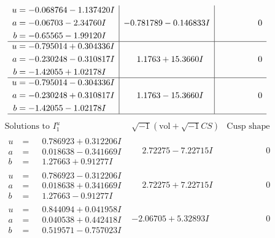 \documentclass[1p]{elsarticle_modified}
\theoremstyle{definition}
\newcommand{\I}{\sqrt{-1}}
\begin{document}
$$\begin{array}{c|c|c}
\begin{aligned}
u &= -0.068764 - 1.137420 I \\
a &= -0.06703 - 2.34760 I \\
b &= -0.65565 - 1.99120 I\end{aligned}
 & -0.781789 - 0.146833 I & \phantom{-0.000000 } 0 \\ \hline\begin{aligned}
u &= -0.795014 + 0.304336 I \\
a &= -0.230248 - 0.310817 I \\
b &= -1.42055 + 1.02178 I\end{aligned}
 & \phantom{-}1.1763 + 15.3660 I & \phantom{-0.000000 } 0 \\ \hline\begin{aligned}
u &= -0.795014 - 0.304336 I \\
a &= -0.230248 + 0.310817 I \\
b &= -1.42055 - 1.02178 I\end{aligned}
 & \phantom{-}1.1763 - 15.3660 I & \phantom{-0.000000 } 0\\
 \hline 
 \end{array}$$\newpage$$\begin{array}{c|c|c}  
\text{Solutions to }I^u_{1}& \I (\text{vol} + \sqrt{-1}CS) & \text{Cusp shape}\\
 \hline 
\begin{aligned}
u &= \phantom{-}0.786923 + 0.312206 I \\
a &= \phantom{-}0.018638 - 0.341669 I \\
b &= \phantom{-}1.27663 + 0.91277 I\end{aligned}
 & \phantom{-}2.72275 - 7.22715 I & \phantom{-0.000000 } 0 \\ \hline\begin{aligned}
u &= \phantom{-}0.786923 - 0.312206 I \\
a &= \phantom{-}0.018638 + 0.341669 I \\
b &= \phantom{-}1.27663 - 0.91277 I\end{aligned}
 & \phantom{-}2.72275 + 7.22715 I & \phantom{-0.000000 } 0 \\ \hline\begin{aligned}
u &= \phantom{-}0.844094 + 0.041958 I \\
a &= \phantom{-}0.040538 + 0.442418 I \\
b &= \phantom{-}0.519571 - 0.757023 I\end{aligned}
 & -2.06705 + 5.32893 I & \phantom{-0.000000 } 0 \\ \hline\begin{aligned}

\end{aligned}
\end{array}$$
\end{document}
